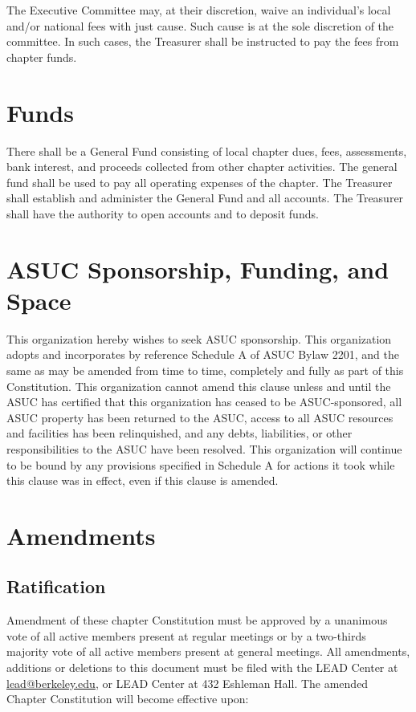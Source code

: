 \documentclass[11pt]{article}
\begin{document}
The Executive Committee may, at their discretion, waive an individual’s local and/or national fees with just cause.
Such cause is at the sole discretion of the committee. In such cases, the Treasurer shall be instructed to pay the fees from chapter funds.
\section{Funds}
\label{sec:org0c46bce}

There shall be a General Fund consisting of local chapter dues, fees, assessments, bank interest, and proceeds collected from other chapter activities.
The general fund shall be used to pay all operating expenses of the chapter.
The Treasurer shall establish and administer the General Fund and all accounts.
The Treasurer shall have the authority to open accounts and to deposit funds.
\section{ASUC Sponsorship, Funding, and Space}
\label{sec:org24df472}

This organization hereby wishes to seek ASUC sponsorship.
This organization adopts and incorporates by reference Schedule A of ASUC Bylaw 2201,  and the same as may be amended from time to time, completely and fully as part of this Constitution.
This organization cannot amend this clause unless and until the ASUC has certified that this organization has ceased to be ASUC-sponsored, all ASUC property has been returned to the ASUC, access to all ASUC resources and facilities has been relinquished, and any debts, liabilities, or other responsibilities to the ASUC have been resolved.
This organization will continue to be bound by any provisions specified in Schedule A for actions it took while this clause was in effect, even if this clause is amended.
\section{Amendments}
\label{sec:org3f8ce15}

\subsection{Ratification}
\label{sec:org4e9391f}

Amendment of these chapter Constitution must be approved by a unanimous vote of all active members present at regular meetings or by a two-thirds majority vote of all active members present at general meetings.
All amendments, additions or deletions to this document must be filed with the LEAD Center at \href{mailto:lead@berkeley.edu}{lead@berkeley.edu}, or LEAD Center at 432 Eshleman Hall.
The amended Chapter Constitution will become effective upon:
\end{document}
